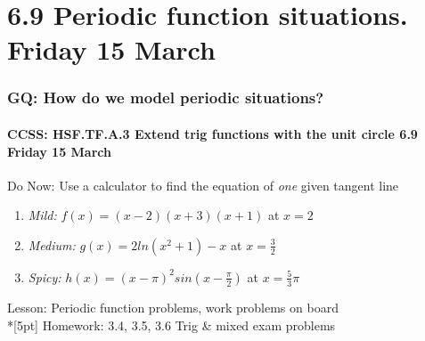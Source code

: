 \documentclass{beamer}
\begin{document}
\section{6.9 Periodic function situations. Friday 15 March}
  \frame
  {
    \frametitle{GQ: How do we model periodic situations?}
    \framesubtitle{CCSS: HSF.TF.A.3 Extend trig functions with the unit circle  \hfill \alert{6.9 Friday 15 March}}

    \begin{block}{Do Now: Use a calculator to find the equation of \emph{one} given tangent line}
    \begin{enumerate}
        \item \emph{Mild:} $f(x)=(x-2)(x+3)(x+1)$ at $x=2$
        \item \emph{Medium:} $g(x)=2ln(x^2+1)-x$ at $x=\frac{3}{2}$
        \item \emph{Spicy:} $h(x)= (x-\pi)^2 sin(x-\frac{\pi}{2})$ at $x=\frac{5}{3} \pi$
    \end{enumerate}
    \end{block}
    Lesson: Periodic function problems, work problems on board\\*[5pt]
    Homework: 3.4, 3.5, 3.6 Trig \& mixed exam problems
  }
\end{document}
